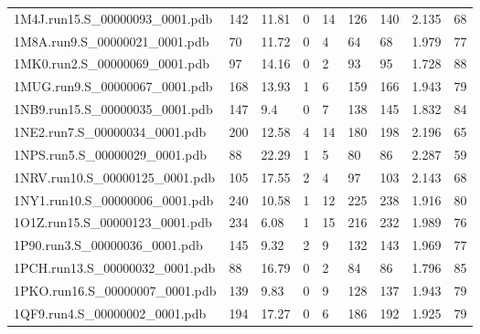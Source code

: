 \documentclass{bioinfo}
\begin{document}
\begin{table*}[!t]
{\begin{tabular}{lllllllll}
    1M4J.run15.S\_00000093\_0001.pdb & 142      & 11.81      & 0           & 14          & 126         & 140     & 2.135           & 68           \\
    1M8A.run9.S\_00000021\_0001.pdb & 70       & 11.72      & 0           & 4           & 64          & 68      & 1.979           & 77           \\
    1MK0.run2.S\_00000069\_0001.pdb & 97       & 14.16      & 0           & 2           & 93          & 95      & 1.728           & 88           \\
    1MUG.run9.S\_00000067\_0001.pdb & 168      & 13.93      & 1           & 6           & 159         & 166     & 1.943           & 79           \\
    1NB9.run15.S\_00000035\_0001.pdb & 147      & 9.4        & 0           & 7           & 138         & 145     & 1.832           & 84           \\
    1NE2.run7.S\_00000034\_0001.pdb & 200      & 12.58      & 4           & 14          & 180         & 198     & 2.196           & 65           \\
    1NPS.run5.S\_00000029\_0001.pdb & 88       & 22.29      & 1           & 5           & 80          & 86      & 2.287           & 59           \\
    1NRV.run10.S\_00000125\_0001.pdb & 105      & 17.55      & 2           & 4           & 97          & 103     & 2.143           & 68           \\
    1NY1.run10.S\_00000006\_0001.pdb & 240      & 10.58      & 1           & 12          & 225         & 238     & 1.916           & 80           \\
    1O1Z.run15.S\_00000123\_0001.pdb & 234      & 6.08       & 1           & 15          & 216         & 232     & 1.989           & 76           \\
    1P90.run3.S\_00000036\_0001.pdb & 145      & 9.32       & 2           & 9           & 132         & 143     & 1.969           & 77           \\
    1PCH.run13.S\_00000032\_0001.pdb & 88       & 16.79      & 0           & 2           & 84          & 86      & 1.796           & 85           \\
    1PKO.run16.S\_00000007\_0001.pdb & 139      & 9.83       & 0           & 9           & 128         & 137     & 1.943           & 79           \\
    1QF9.run4.S\_00000002\_0001.pdb & 194      & 17.27      & 0           & 6           & 186         & 192     & 1.925           & 79           \\

\end{tabular}}
\end{table*}
\end{document}
